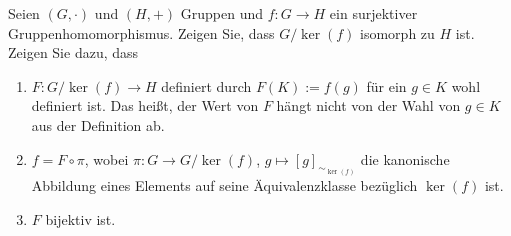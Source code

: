 \documentclass{../problemset}
\begin{document}
\begin{problem}
Seien $(G, \cdot)$ und $(H, +)$ Gruppen und $f: G \to H$ ein surjektiver Gruppenhomomorphismus. Zeigen Sie, dass $G/\ker(f)$ isomorph zu $H$ ist. Zeigen Sie dazu, dass
\begin{enumerate}
	\item $F: G/\ker(f) \to H$ definiert durch $F(K) := f(g)$ für ein $g \in K$ wohl definiert ist. Das heißt, der Wert von $F$ hängt nicht von der Wahl von $g \in K$ aus der Definition ab.
	\item $f = F \circ \pi$, wobei $\pi: G \to G/\ker(f)$, $g \mapsto [g]_{\sim_{\ker(f)}}$ die kanonische Abbildung eines Elements auf seine Äquivalenzklasse bezüglich $\ker(f)$ ist.
	\item $F$ bijektiv ist.
\end{enumerate}

\end{problem}

\pagebreak
\end{document}
